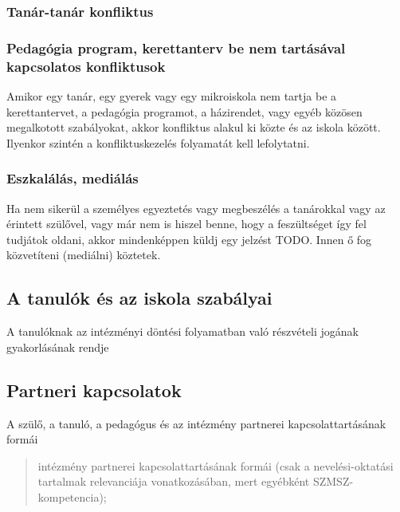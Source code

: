\subsubsection{Tanár-tanár
  konfliktus}\label{tanuxe1r-tanuxe1r-konfliktus}


\subsubsection{Pedagógia program, kerettanterv be nem tartásával
  kapcsolatos konfliktusok}

Amikor egy tanár, egy gyerek vagy egy mikroiskola nem tartja be a
kerettantervet, a pedagógia programot, a házirendet, vagy egyéb közösen
megalkotott szabályokat, akkor konfliktus alakul ki közte és az iskola
között. Ilyenkor szintén a konfliktuskezelés folyamatát kell
lefolytatni.

\subsubsection{Eszkalálás, mediálás}

Ha nem sikerül a személyes egyeztetés vagy megbeszélés a tanárokkal vagy
az érintett szülővel, vagy már nem is hiszel benne, hogy a feszültséget
így fel tudjátok oldani, akkor mindenképpen küldj egy jelzést TODO. Innen ő fog
közvetíteni (mediálni) köztetek.

\subsection{A tanulók és az iskola
  szabályai}\label{a-tanuluxf3k-uxe9s-az-iskola-szabuxe1lyai}

A tanulóknak az intézményi döntési folyamatban való részvételi jogának
gyakorlásának rendje

\subsection{Partneri kapcsolatok}\label{partneri-kapcsolatok}

A szülő, a tanuló, a pedagógus és az intézmény partnerei
kapcsolattartásának formái

\begin{quote}
  intézmény partnerei kapcsolattartásának formái (csak a nevelési-oktatási
  tartalmak relevanciája vonatkozásában, mert egyébként
  SZMSZ-kompetencia);
\end{quote}
